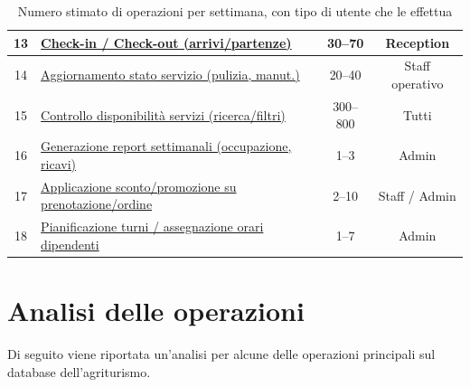 \documentclass[a4paper,12pt]{report}
\begin{document}
\begin{table}[H]
\begin{tabularx}{\textwidth}{|c|>{\raggedright\arraybackslash}X|c|c|}
		\hline
		13          & \hyperref[op13]{Check-in / Check-out (arrivi/partenze)}                & 30--70            & Reception              \\
		\hline
		14          & \hyperref[op14]{Aggiornamento stato servizio (pulizia, manut.)}        & 20--40            & Staff operativo        \\
		\hline
		15          & \hyperref[op15]{Controllo disponibilità servizi (ricerca/filtri)}      & 300--800          & Tutti                  \\
		\hline
		16          & \hyperref[op16]{Generazione report settimanali (occupazione, ricavi)}  & 1--3              & Admin                  \\
		\hline
		17          & \hyperref[op17]{Applicazione sconto/promozione su prenotazione/ordine} & 2--10             & Staff / Admin          \\
		\hline
		18          & \hyperref[op18]{Pianificazione turni / assegnazione orari dipendenti}  & 1--7              & Admin                  \\
		\hline
	\end{tabularx}
	\caption{Numero stimato di operazioni per settimana, con tipo di utente che le effettua}
	\label{tab:operazioni-settimanali}
\end{table}

\newpage
\section{Analisi delle operazioni}
Di seguito viene riportata un'analisi per alcune delle operazioni principali sul database dell'agriturismo.
\end{document}
